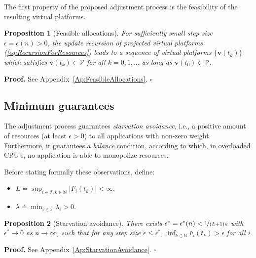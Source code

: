 \documentclass[letter,11pt]{article}
\newtheorem{proposition}{Proposition}[section]
\newenvironment{proof}{\textbf{Proof.}}{$\square$\\}
\begin{document}
The first property of the proposed adjustment process is the feasibility of the resulting virtual platforms. 
\begin{proposition}[Feasible allocations] \label{Pr:FeasibleAllocations} For sufficiently small step size $\epsilon=\epsilon(n)>0$, the update recursion of projected virtual platforms (\ref{eq:RecursionForResources}) leads to a sequence of virtual platforms $\{{\mathbf{v}}(t_k)\}$ which satisfies  ${\mathbf{v}}(t_k)\in{\mathcal{V}}$ for all $k=0,1,...$ as long as ${\mathbf{v}}(t_0)\in{\mathcal{V}}$.
\end{proposition}
\begin{proof}
  See Appendix~\ref{Ap:FeasibleAllocations}.
\end{proof}

\subsection{Minimum guarantees}
\label{sec:MinimumGuarantees}

The adjustment process guarantees \emph{starvation avoidance}, i.e., a positive amount of resources (at least $\epsilon>0$) to all applications with non-zero weight. Furthermore, it guarantees a \emph{balance} condition, according to which, in overloaded CPU's, no application is able to monopolize resources.

Before stating formally these observations, define: 
\begin{itemize}
\item $L {\doteq} \sup_{i\in\mathcal{I},k\in\mathbb{N}}|F_i(t_k)|<\infty$, 
\item $\lambda{\doteq}\min_{i\in\mathcal{I}}\lambda_i > 0$.
\end{itemize}

\begin{proposition}[Starvation avoidance] \label{Pr:StarvationAvoidance}
There exists $\epsilon^*=\epsilon^*(n)<\nicefrac{1}{(L+1)\kappa}$ with $\epsilon^*\to{0}$ as $n\to\infty$, such that for any step size $\epsilon\leq\epsilon^*$,  $\inf_{k\in\mathbb{N}}{\bar{v}}_i(t_k)>\epsilon$ for all $i$.
\end{proposition}
\begin{proof}
See Appendix~\ref{Ap:StarvationAvoidance}.
\end{proof}
\end{document}
